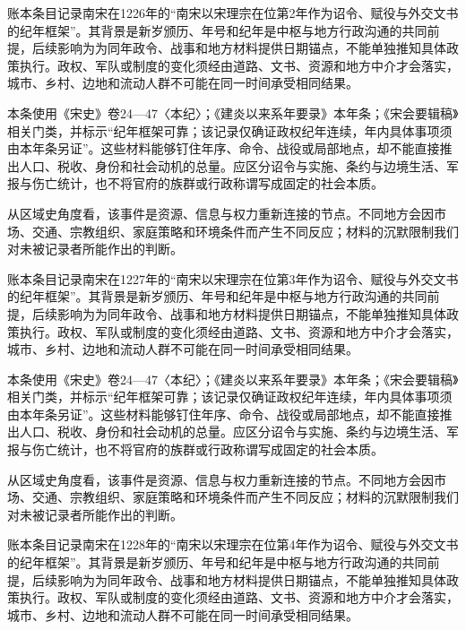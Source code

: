账本条目记录南宋在1226年的“南宋以宋理宗在位第2年作为诏令、赋役与外交文书的纪年框架”。其背景是新岁颁历、年号和纪年是中枢与地方行政沟通的共同前提，后续影响为为同年政令、战事和地方材料提供日期锚点，不能单独推知具体政策执行。政权、军队或制度的变化须经由道路、文书、资源和地方中介才会落实，城市、乡村、边地和流动人群不可能在同一时间承受相同结果。

本条使用《宋史》卷24—47〈本纪〉；《建炎以来系年要录》本年条；《宋会要辑稿》相关门类，并标示“纪年框架可靠；该记录仅确证政权纪年连续，年内具体事项须由本年条另证”。这些材料能够钉住年序、命令、战役或局部地点，却不能直接推出人口、税收、身份和社会动机的总量。应区分诏令与实施、条约与边境生活、军报与伤亡统计，也不将官府的族群或行政称谓写成固定的社会本质。

从区域史角度看，该事件是资源、信息与权力重新连接的节点。不同地方会因市场、交通、宗教组织、家庭策略和环境条件而产生不同反应；材料的沉默限制我们对未被记录者所能作出的判断。

账本条目记录南宋在1227年的“南宋以宋理宗在位第3年作为诏令、赋役与外交文书的纪年框架”。其背景是新岁颁历、年号和纪年是中枢与地方行政沟通的共同前提，后续影响为为同年政令、战事和地方材料提供日期锚点，不能单独推知具体政策执行。政权、军队或制度的变化须经由道路、文书、资源和地方中介才会落实，城市、乡村、边地和流动人群不可能在同一时间承受相同结果。

本条使用《宋史》卷24—47〈本纪〉；《建炎以来系年要录》本年条；《宋会要辑稿》相关门类，并标示“纪年框架可靠；该记录仅确证政权纪年连续，年内具体事项须由本年条另证”。这些材料能够钉住年序、命令、战役或局部地点，却不能直接推出人口、税收、身份和社会动机的总量。应区分诏令与实施、条约与边境生活、军报与伤亡统计，也不将官府的族群或行政称谓写成固定的社会本质。

从区域史角度看，该事件是资源、信息与权力重新连接的节点。不同地方会因市场、交通、宗教组织、家庭策略和环境条件而产生不同反应；材料的沉默限制我们对未被记录者所能作出的判断。

账本条目记录南宋在1228年的“南宋以宋理宗在位第4年作为诏令、赋役与外交文书的纪年框架”。其背景是新岁颁历、年号和纪年是中枢与地方行政沟通的共同前提，后续影响为为同年政令、战事和地方材料提供日期锚点，不能单独推知具体政策执行。政权、军队或制度的变化须经由道路、文书、资源和地方中介才会落实，城市、乡村、边地和流动人群不可能在同一时间承受相同结果。


